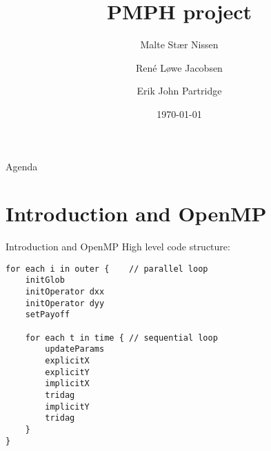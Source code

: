 \documentclass[14pt,t,english]{beamer}
\title{PMPH project}
\author[Malte Stær Nissen, René Løwe Jacobsen, and Erik John Partridge]{Malte Stær Nissen \\\and René Løwe Jacobsen \\\and Erik John Partridge}
\institute{Department of Computer Science}
\date[]{\today}
\begin{document}
%
\frame[plain]{\titlepage}
%
\begin{frame}{Agenda}
	\tableofcontents
\end{frame}
%
\section{Introduction and OpenMP}
\begin{frame}[c,fragile]{Introduction and OpenMP}
High level code structure:
\begingroup
	\fontsize{10pt}{12pt}\selectfont
\begin{verbatim}
for each i in outer {    // parallel loop
    initGlob
    initOperator dxx
    initOperator dyy
    setPayoff

    for each t in time { // sequential loop
        updateParams
        explicitX
        explicitY
        implicitX
        tridag
        implicitY
        tridag
    }
}
\end{verbatim}
\endgroup
\end{frame}
%
\end{document}
